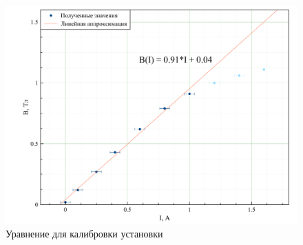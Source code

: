 \documentclass[a4paper, 12pt]{article}
\begin{document}
	\begin {figure}[H]
		\begin{center}
			\includegraphics[width = 0.9 \textwidth]{Equation}
			\caption{Уравнение для калибровки установки}
		\end{center}
	\end {figure}
\end{document}
